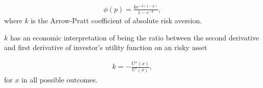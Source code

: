 \begin{align}
	\phi(p) =\frac{k e^{-k(1-p)}}{1-e^{-k}} ,
	\end{align}
where $k$ is the Arrow-Pratt coefficient of absolute risk aversion. \medskip

$k$ has an economic interpretation of being the ratio between the second derivative and first derivative
of investor's utility function on an risky asset

\begin{align}
	k = -\frac{U''(x)}{U'(x)},
	\end{align}
for $x$ in all possible outcomes.



